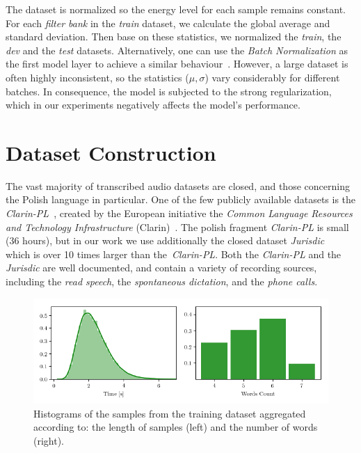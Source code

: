 The dataset is normalized so the energy level for each sample remains constant.
For each \textit{filter bank} in the \textit{train} dataset, we calculate the global
average and standard deviation.
Then base on these statistics, we normalized the \textit{train}, the \textit{dev} and the \textit{test} datasets.
Alternatively, one can use the \textit{Batch Normalization} as the first model layer
to achieve a similar behaviour~\cite{ioffe2015}.
However, a large dataset is often highly inconsistent, so the statistics ($\mu, \sigma$)
vary considerably for different batches.
In consequence, the model is subjected to the strong regularization, which in our experiments negatively
affects the model's performance.


\section{Dataset Construction}\label{sec:dataset-construction}

The vast majority of transcribed audio datasets are closed, and those concerning the Polish language in particular.
One of the few publicly available datasets is the \textit{Clarin-PL}~\cite{korzinek2017},
created by the European initiative the \textit{Common Language Resources and Technology Infrastructure} (Clarin)~\cite{varadi2008}.
The polish fragment \textit{Clarin-PL} is small (36 hours), but in our work
we use additionally the closed dataset \textit{Jurisdic}~\cite{demenko2008} which is over 10 times
larger than the~\textit{Clarin-PL}.
Both the \textit{Clarin-PL} and the \textit{Jurisdic} are well documented,
and contain a variety of recording sources, including the \textit{read speech},
the \textit{spontaneous dictation}, and the \textit{phone calls}.

\begin{figure}[!h]
    \centering
    \includegraphics[width=13cm]{figures/data-histogram.png}
    \caption{
Histograms of the samples from the training dataset aggregated according to: the length of samples (left)
and the number of words (right).}
    \label{fig:data_histograms}
\end{figure}

